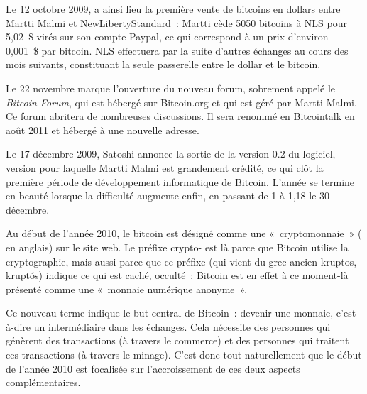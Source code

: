 Le 12 octobre 2009, a ainsi lieu la première vente de bitcoins en dollars entre Martti Malmi et NewLibertyStandard~: Martti cède 5050 bitcoins à NLS pour 5,02~\$ virés sur son compte Paypal, ce qui correspond à un prix d'environ 0,001~\$ par bitcoin. NLS effectuera par la suite d'autres échanges au cours des mois suivants, constituant la seule passerelle entre le dollar et le bitcoin.

Le 22 novembre marque l'ouverture du nouveau forum, sobrement appelé le \emph{Bitcoin Forum}, qui est hébergé sur Bitcoin.org et qui est géré par Martti Malmi. Ce forum abritera de nombreuses discussions. Il sera renommé en Bitcointalk en août 2011 et hébergé à une nouvelle adresse.

Le 17 décembre 2009, Satoshi annonce la sortie de la version 0.2 du logiciel, version pour laquelle Martti Malmi est grandement crédité, ce qui clôt la première période de développement informatique de Bitcoin. L'année se termine en beauté lorsque la difficulté augmente enfin, en passant de 1 à 1,18 le 30 décembre.

Au début de l'année 2010, le bitcoin est désigné comme une «~cryptomonnaie~» ( en anglais) sur le site web. Le préfixe crypto- est là parce que Bitcoin utilise la cryptographie, mais aussi parce que ce préfixe (qui vient du grec ancien \foreignlanguage{greek}{kruptos}, kruptós) indique ce qui est caché, occulté~: Bitcoin est en effet à ce moment-là présenté comme une «~monnaie numérique anonyme~».

Ce nouveau terme indique le but central de Bitcoin~: devenir une monnaie, c'est-à-dire un intermédiaire dans les échanges. Cela nécessite des personnes qui génèrent des transactions (à travers le commerce) et des personnes qui traitent ces transactions (à travers le minage). C'est donc tout naturellement que le début de l'année 2010 est focalisée sur l'accroissement de ces deux aspects complémentaires.


